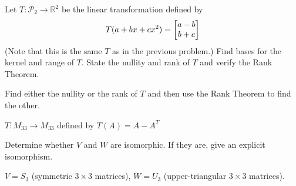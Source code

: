 \documentclass[boxes]{gsypset}
\begin{document}
	\begin{problem}[6.5.7]
		Let $T: \mathscr{P}_2 \to \mathbb{R}^2$ be the linear transformation defined by
		\[
			T(a + bx + cx^2) = \begin{bmatrix}a-b\\b+c\end{bmatrix}
		\]
		(Note that this is the same $T$ as in the previous problem.)
		Find bases for the kernel and range of $T$.
		State the nullity and rank of $T$ and verify the Rank Theorem.
	\end{problem}
	\begin{solution}
		
	\end{solution}
	
	\begin{problem}[6.5.14]
		Find either the nullity or the rank of $T$ and then use the Rank Theorem to find the other.
		
		$T: M_{33} \to M_{33}$ defined by $T(A) = A - A^T$
	\end{problem}
	\begin{solution}
		
	\end{solution}
	
	\begin{problem}[6.5.22]
		Determine whether $V$ and $W$ are isomorphic. 
		If they are, give an explicit isomorphism.
		
		$V = S_3$ (symmetric $3\times3$ matrices),
		$W = U_3$ (upper-triangular $3\times3$ matrices).
	\end{problem}
	\begin{solution}
		
	\end{solution}
\end{document}
